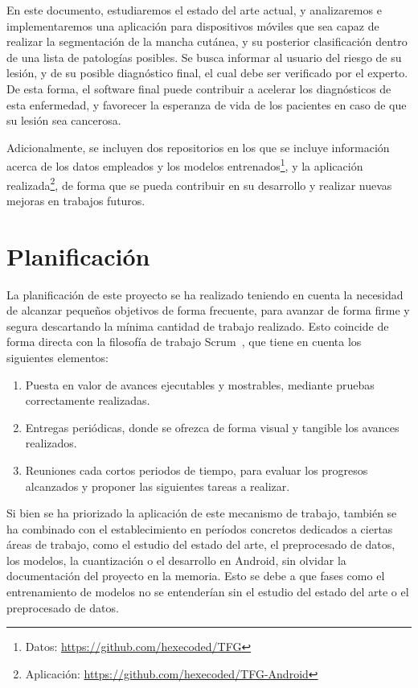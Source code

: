 En este documento, estudiaremos el estado del arte actual, y analizaremos e implementaremos una aplicación para dispositivos móviles que sea capaz de realizar la segmentación de la mancha cutánea, y su posterior clasificación dentro de una lista de patologías posibles. Se busca informar al usuario del riesgo de su lesión, y de su posible diagnóstico final, el cual debe ser verificado por el experto. De esta forma, el software final puede contribuir a acelerar los diagnósticos de esta enfermedad,  y favorecer la esperanza de vida de los pacientes en caso de que su lesión sea cancerosa.

Adicionalmente, se incluyen dos repositorios en los que se incluye información acerca de los datos empleados y los modelos entrenados\footnote{Datos: \url{https://github.com/hexecoded/TFG}}, y la aplicación realizada\footnote{Aplicación: \url{https://github.com/hexecoded/TFG-Android}}, de forma que se pueda contribuir en su desarrollo y realizar nuevas mejoras en trabajos futuros.

\section{Planificación}

La planificación de este proyecto se ha realizado teniendo en cuenta la necesidad de alcanzar pequeños objetivos de forma frecuente, para avanzar de forma firme y segura descartando la mínima cantidad de trabajo realizado. Esto coincide de forma directa con la filosofía de trabajo Scrum~\cite{schwaber2011scrum}, que tiene en cuenta los siguientes elementos:

\begin{enumerate}
	\item Puesta en valor de avances ejecutables y mostrables, mediante pruebas correctamente realizadas.
	\item Entregas periódicas, donde se ofrezca de forma visual y tangible los avances realizados.
	\item Reuniones cada cortos periodos de tiempo, para evaluar los progresos alcanzados y proponer las siguientes tareas a realizar.
\end{enumerate}

Si bien se ha priorizado la aplicación de este mecanismo de trabajo, también se ha combinado con el establecimiento en períodos concretos dedicados a ciertas áreas de trabajo, como el estudio del estado del arte, el preprocesado de datos, los modelos, la cuantización o el desarrollo en Android, sin olvidar la documentación del proyecto en la memoria. Esto se debe a que fases como el entrenamiento de modelos no se entenderían sin el estudio del estado del arte o el preprocesado de datos.

